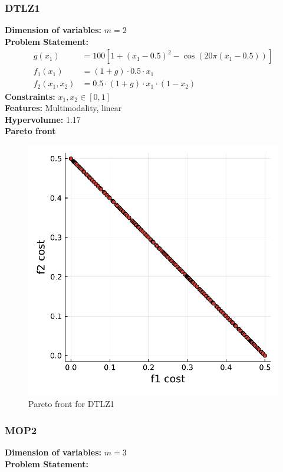 \documentclass[11pt,oneside,onecolumn,openright]{article}
\begin{document}
   \subsubsection{DTLZ1~\cite{huband2006review}}
     \textbf{Dimension of variables: }$m=2$\\
  \noindent\textbf{Problem Statement: }
   \begin{equation}
   \begin{aligned}
  g(x_1) &=100\left[1+\left(x_{1}-0.5\right)^{2}-\cos \left(20 \pi\left(x_{1}-0.5\right)\right)\right]\\
  f_{1}(x_1)&=(1+g)\cdot 0.5\cdot x_{1}\\
  f_2(x_1,x_2)&=0.5 \cdot(1 + g) \cdot x_1 \cdot (1 - x_2)
  \end{aligned}
  \end{equation}
  \noindent\textbf{Constraints: } $x_{1}, x_{2} \in[0,1]$\\
  \noindent\textbf{Features: } Multimodality, linear\\
  \noindent\textbf{Hypervolume: } 1.17\\
  \noindent\textbf{Pareto front}
      \begin{figure}[H]
      \centering
      \includegraphics[width=12cm]{fig/DTLZ1n2.pdf}
      \cprotect\caption{Pareto front for DTLZ1}
      \end{figure}


  \subsubsection{MOP2~\cite{huband2006review}}
   \textbf{Dimension of variables: }$m=3$\\
  \noindent\textbf{Problem Statement: }
\end{document}
